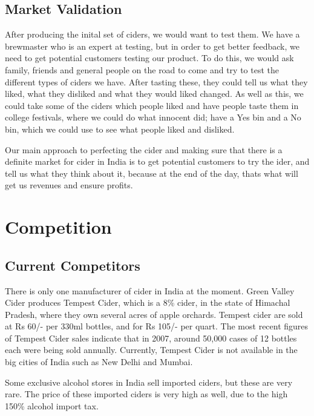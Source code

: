 \documentclass[11pt]{article}
\begin{document}
  \subsection{Market Validation}
After producing the inital set of ciders, we would want to test them. We have
a brewmaster who is an expert at testing, but in order to get better feedback,
we need to get potential customers testing our product. To do this, we would
ask family, friends and general people on the road to come and try to test
the different types of ciders we have. After tasting these, they could tell us
what they liked, what they disliked and what they would liked changed.
As well as this, we could take some of the ciders which people liked and have
people taste them in college festivals, where we could do what innocent did;
have a Yes bin and a No bin, which we could use to see what people liked and
disliked.

Our main approach to perfecting the cider and making sure that there is a
definite market for cider in India is to get potential customers to try the 
ider, and tell us what they think about it, because at the end of the day, thats 
what will get us revenues and ensure profits. 

\newpage


\section{Competition}
	\subsection{Current Competitors}
There is only one manufacturer of cider in India at the moment. Green Valley
Cider produces Tempest Cider, which is a 8\% cider, in the state of Himachal
Pradesh, where they own several acres of apple orchards. Tempest cider are sold
at Rs 60/- per 330ml bottles, and for Rs 105/- per quart. The most recent
figures of Tempest Cider sales indicate that in 2007, around 50,000 cases of 12
bottles each were being sold annually. Currently, Tempest Cider is not available
in the big cities of India such as New Delhi and Mumbai.

Some exclusive alcohol stores in India sell imported ciders, but these are very
rare. The price of these imported ciders is very high as well, due to the high
150\% alcohol import tax.
\end{document}
